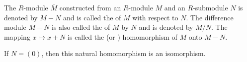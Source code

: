 The $R$-module $\bar{M}$ constructed from an $R$-module $M$ and an $R$-submodule $N$ is denoted by $M - N$ and is called the  of $M$ with respect to $N$. The difference module $M - N$ is also called the  of $M$ by $N$ and is denoted by $M/N$. The mapping $x \mapsto x + N$ is called the  (or ) homomorphism of $M$ onto $M - N$.

If $N = (0)$, then this natural homomorphism is an isomorphism.
